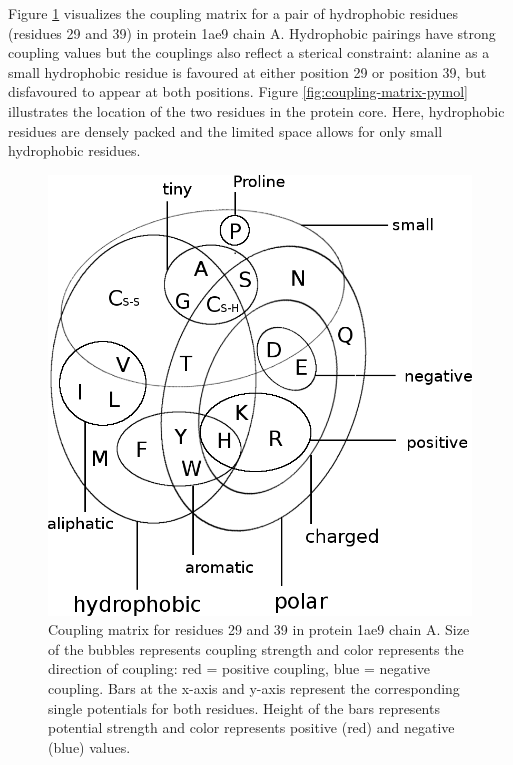 \documentclass[12pt,a4paper,twoside]{book}
\theoremstyle{definition}
\theoremstyle{definition}
\theoremstyle{remark}
\begin{document}
Figure \ref{fig:coupling-matrix-hydrophobic-interaction} visualizes the
coupling matrix for a pair of hydrophobic residues (residues 29 and 39)
in protein 1ae9 chain A. Hydrophobic pairings have strong coupling
values but the couplings also reflect a sterical constraint: alanine as
a small hydrophobic residue is favoured at either position 29 or
position 39, but disfavoured to appear at both positions. Figure
\ref{fig:coupling-matrix-pymol} illustrates the location of the two
residues in the protein core. Here, hydrophobic residues are densely
packed and the limited space allows for only small hydrophobic residues.









\begin{figure}
\includegraphics[width=1\linewidth]{img/amino_acid_physico_chemical_properties_venn_diagramm} \caption{Coupling matrix
for residues 29 and 39 in protein 1ae9 chain A. Size of the bubbles
represents coupling strength and color represents the direction of
coupling: red = positive coupling, blue = negative coupling. Bars at the
x-axis and y-axis represent the corresponding single potentials for both
residues. Height of the bars represents potential strength and color
represents positive (red) and negative (blue) values.}\label{fig:coupling-matrix-hydrophobic-interaction}
\end{figure}
\end{document}
